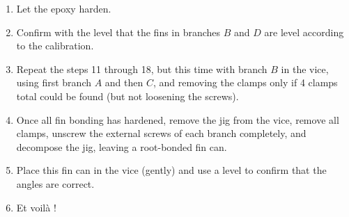 \documentclass{amsdtx}
\begin{document}
\begin{enumerate}
	\item Let the epoxy harden.
	\item Confirm with the level that the fins in branches $B$ and $D$ are level according to the calibration.
	\item Repeat the steps 11 through 18, but this time with branch $B$ in the vice, using first branch $A$ and then $C$, and removing the clamps only if 4 clamps total could be found (but not loosening the screws).
	\item Once all fin bonding has hardened, remove the jig from the vice, remove all clamps, unscrew the external screws of each branch completely, and decompose the jig, leaving a root-bonded fin can. 
	\item Place this fin can in the vice (gently) and use a level to confirm that the angles are correct.
	\item Et voil\`a !
\end{enumerate}
\end{document}
